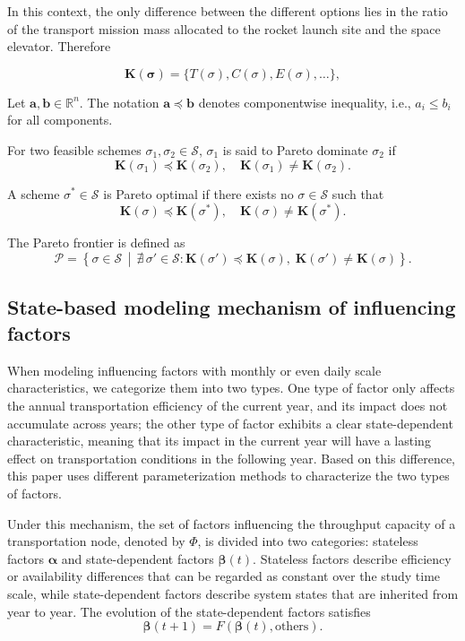 \documentclass[12pt]{article}
\begin{document}
In this context, the only difference between the different options lies in the ratio of the transport mission mass allocated to the rocket launch site and the space elevator. Therefore

\[
\boldsymbol{K(\sigma)} = \{ T(\sigma), C(\sigma), E(\sigma), \ldots \} ,
\]

Let $\boldsymbol{a},\boldsymbol{b}\in\mathbb{R}^n$.
The notation $\boldsymbol{a}\preceq\boldsymbol{b}$ denotes
componentwise inequality, i.e.,
$a_i\le b_i$ for all components.

For two feasible schemes $\sigma_1,\sigma_2\in\mathcal S$,
$\sigma_1$ is said to Pareto dominate $\sigma_2$ if
\[
\boldsymbol K(\sigma_1)\preceq \boldsymbol K(\sigma_2),
\quad
\boldsymbol K(\sigma_1)\ne \boldsymbol K(\sigma_2).
\]

A scheme $\sigma^\ast\in\mathcal S$ is Pareto optimal if there exists no
$\sigma\in\mathcal S$ such that
\[
\boldsymbol K(\sigma)\preceq \boldsymbol K(\sigma^\ast),
\quad
\boldsymbol K(\sigma)\ne \boldsymbol K(\sigma^\ast).
\]

The Pareto frontier is defined as
\[
\mathcal P
=
\left\{
\sigma\in\mathcal S \,\middle|\,
\nexists\,\sigma'\in\mathcal S :
\boldsymbol K(\sigma')\preceq \boldsymbol K(\sigma),
\;
\boldsymbol K(\sigma')\ne \boldsymbol K(\sigma)
\right\}.
\]


\subsection{State-based modeling mechanism of influencing factors}

When modeling influencing factors with monthly or even daily scale characteristics, we categorize them into two types. One type of factor only affects the annual transportation efficiency of the current year, and its impact does not accumulate across years; the other type of factor exhibits a clear state-dependent characteristic, meaning that its impact in the current year will have a lasting effect on transportation conditions in the following year. Based on this difference, this paper uses different parameterization methods to characterize the two types of factors.

Under this mechanism, the set of factors influencing the throughput capacity of a transportation node, denoted by $\Phi$, is divided into two categories: stateless factors $\boldsymbol{\alpha}$ and state-dependent factors $\boldsymbol{\beta}(t)$. Stateless factors describe efficiency or availability differences that can be regarded as constant over the study time scale, while state-dependent factors describe system states that are inherited from year to year. The evolution of the state-dependent factors satisfies
\[
\boldsymbol{\beta}(t+1) = F(\boldsymbol{\beta}(t), \text{others}) .
\]
\end{document}
